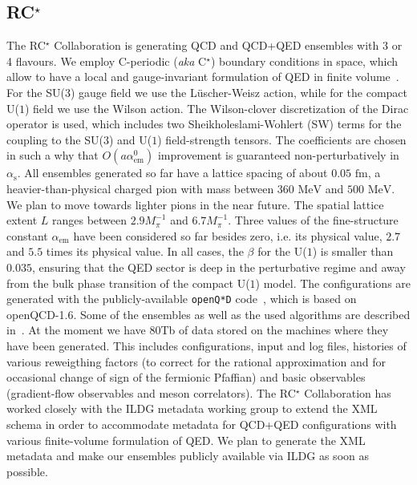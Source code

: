 \documentclass[a4paper,11pt]{article}
\begin{document}
\subsection{RC$^\star$}
The RC$^\star$ Collaboration is generating QCD and QCD+QED ensembles
with 3 or 4 flavours. We employ C-periodic (\textit{aka} C$^\star$)
boundary conditions in space, which allow to have a local and
gauge-invariant formulation of QED in finite
volume~\cite{Lucini:2015hfa}. For the SU($3$) gauge field we use the
L\"uscher-Weisz action, while for the compact U($1$) field we use the
Wilson action. The Wilson-clover discretization of the Dirac operator
is used, which includes two Sheikholeslami-Wohlert (SW) terms for the
coupling to the SU($3$) and U($1$) field-strength tensors. The
coefficients are chosen in such a why that $O(a \alpha_{\text{em}}^0)$
improvement is guaranteed non-perturbatively in
$\alpha_{\text{s}}$. All ensembles generated so far have a lattice
spacing of about $0.05\text{ fm}$, a heavier-than-physical charged
pion with mass between $360\text{ MeV}$ and $500\text{ MeV}$. We plan
to move towards lighter pions in the near future. The spatial lattice
extent $L$ ranges between $2.9M_\pi^{-1}$ and $6.7M_\pi^{-1}$. Three
values of the fine-structure constant $\alpha_{\text{em}}$ have been
considered so far besides zero, i.e. its physical value, $2.7$ and
$5.5$ times its physical value. In all cases, the $\beta$ for the
U($1$) is smaller than $0.035$, ensuring that the QED sector is deep
in the perturbative regime and away from the bulk phase transition of
the compact U($1$) model. The configurations are generated with the
publicly-available \texttt{openQ*D}
code~\cite{Campos:2019kgw,10261_173334}, which is based on
openQCD-1.6. Some of the ensembles as well as the used algorithms are
described in~\cite{RCstar:2022yjz}. At the moment we have 80Tb of data
stored on the machines where they have been generated. This includes
configurations, input and log files, histories of various reweigthing
factors (to correct for the rational approximation and for occasional
change of sign of the fermionic Pfaffian) and basic observables
(gradient-flow observables and meson correlators). The RC$^\star$
Collaboration has worked closely with the ILDG metadata working group
to extend the XML schema in order to accommodate metadata for QCD+QED
configurations with various finite-volume formulation of QED. We plan
to generate the XML metadata and make our ensembles publicly available
via ILDG as soon as possible.

\end{document}
